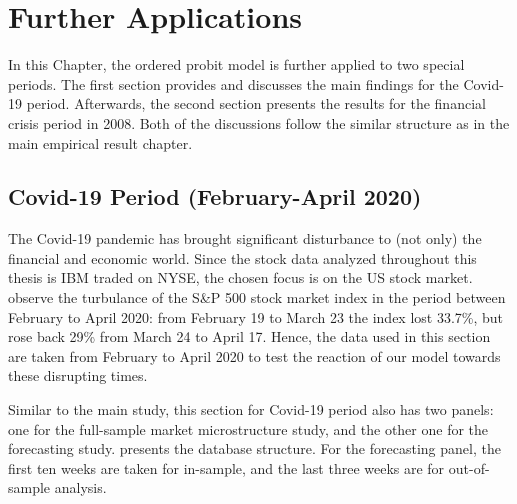 \chapter{Further Applications}\label{chap:extension}

In this Chapter, the ordered probit model is further applied to two special periods. The first section provides and discusses the main findings for the Covid-19 period. Afterwards, the second section presents the results for the financial crisis period in 2008. Both of the discussions follow the similar structure as in the main empirical result chapter.


\section{Covid-19 Period (February-April 2020)}

The Covid-19 pandemic has brought significant disturbance to (not only) the financial and economic world. Since the stock data analyzed throughout this thesis is IBM traded on NYSE, the chosen focus is on the US stock market. \citet{coxetal2020} observe the turbulance of the S\&P 500 stock market index in the period between February to April 2020: from February 19 to March 23 the index lost 33.7\%, but rose back 29\% from March 24 to April 17. Hence, the data used in this section are taken from February to April 2020 to test the reaction of our model towards these disrupting times.


Similar to the main study, this section for Covid-19 period also has two panels: one for the full-sample market microstructure study, and the other one for the forecasting study.  presents the database structure. For the forecasting panel, the first ten weeks are taken for in-sample, and the last three weeks are for out-of-sample analysis.

\begin{table}[ht]
\centering
\small
\renewcommand{\arraystretch}{1.3} %
\setlength{\tabcolsep}{10pt} %
\caption{Summary of Database: IBM traded on NYSE (February-April 2020).}
\label{tab:table-12}
\end{table}


